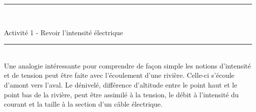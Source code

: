 \documentclass[11pt,a4paper]{article}
\begin{document}
\hrule\


\begin{center}
 \LARGE{Activité 1 - Revoir l'intensité électrique}
\end{center}


\normalsize

\hrule\
\\[0,2cm]



Une analogie intéressante pour comprendre de façon simple les notions d'intensité et de tension peut être faite avec l'écoulement d'une rivière. Celle-ci s'écoule d'amont vers l'aval.  Le dénivelé, différence d'altitude entre le point haut et le point bas de la rivière, peut être assimilé à la tension, le débit à l'intensité du courant et la taille à la section d'un câble électrique.



\vfill 
\end{document}
